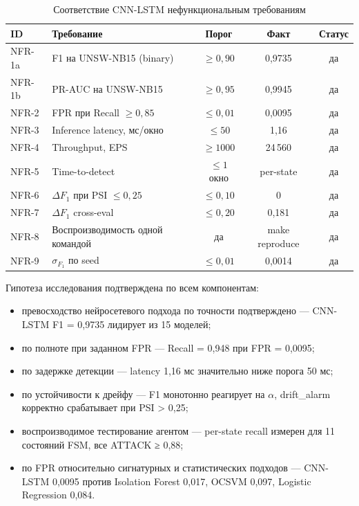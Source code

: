 \begin{table}[H]
\caption{Соответствие CNN-LSTM нефункциональным требованиям}
\label{tab:nfr-final}
\centering
\small
\begin{tabular}{|l|L{6cm}|c|c|c|}
\hline
ID & Требование & Порог & Факт & Статус \\
\hline
NFR-1a & F1 на UNSW-NB15 (binary) & $\geq 0{,}90$ & 0,9735 & да \\
\hline
NFR-1b & PR-AUC на UNSW-NB15 & $\geq 0{,}95$ & 0,9945 & да \\
\hline
NFR-2 & FPR при Recall $\geq 0{,}85$ & $\leq 0{,}01$ & 0,0095 & да \\
\hline
NFR-3 & Inference latency, мс/окно & $\leq 50$ & 1,16 & да \\
\hline
NFR-4 & Throughput, EPS & $\geq 1000$ & 24\,560 & да \\
\hline
NFR-5 & Time-to-detect & $\leq 1$ окно & per-state & да \\
\hline
NFR-6 & $\Delta F_1$ при PSI $\leq 0{,}25$ & $\leq 0{,}10$ & 0 & да \\
\hline
NFR-7 & $\Delta F_1$ cross-eval & $\leq 0{,}20$ & 0,181 & да \\
\hline
NFR-8 & Воспроизводимость одной командой & да & make reproduce & да \\
\hline
NFR-9 & $\sigma_{F_1}$ по seed & $\leq 0{,}01$ & 0,0014 & да \\
\hline
\end{tabular}
\end{table}

Гипотеза исследования подтверждена по всем компонентам:
\begin{itemize}
    \item превосходство нейросетевого подхода по точности
    подтверждено --- CNN-LSTM F1 = 0,9735 лидирует из 15 моделей;
    \item по полноте при заданном FPR --- Recall = 0,948 при
    FPR = 0,0095;
    \item по задержке детекции --- latency 1,16 мс значительно
    ниже порога 50 мс;
    \item по устойчивости к дрейфу --- F1 монотонно реагирует на
    $\alpha$, drift\_alarm корректно срабатывает при PSI > 0,25;
    \item воспроизводимое тестирование агентом --- per-state recall
    измерен для 11 состояний FSM, все ATTACK ≥ 0,88;
    \item по FPR относительно сигнатурных и статистических подходов
    --- CNN-LSTM 0,0095 против Isolation Forest 0,017, OCSVM 0,097,
    Logistic Regression 0,084.
\end{itemize}

